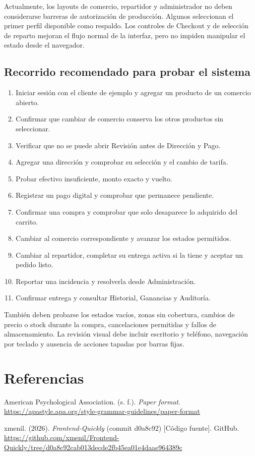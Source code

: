 \documentclass[12pt,letterpaper]{article}
\begin{document}
Actualmente, los layouts de comercio, repartidor y administrador no deben considerarse barreras de autorización de producción. Algunos seleccionan el primer perfil disponible como respaldo. Los controles de Checkout y de selección de reparto mejoran el flujo normal de la interfaz, pero no impiden manipular el estado desde el navegador.

\subsection{Recorrido recomendado para probar el sistema}

\begin{enumerate}
  \item Iniciar sesión con el cliente de ejemplo y agregar un producto de un comercio abierto.
  \item Confirmar que cambiar de comercio conserva los otros productos sin seleccionar.
  \item Verificar que no se puede abrir Revisión antes de Dirección y Pago.
  \item Agregar una dirección y comprobar su selección y el cambio de tarifa.
  \item Probar efectivo insuficiente, monto exacto y vuelto.
  \item Registrar un pago digital y comprobar que permanece pendiente.
  \item Confirmar una compra y comprobar que solo desaparece lo adquirido del carrito.
  \item Cambiar al comercio correspondiente y avanzar los estados permitidos.
  \item Cambiar al repartidor, completar su entrega activa si la tiene y aceptar un pedido listo.
  \item Reportar una incidencia y resolverla desde Administración.
  \item Confirmar entrega y consultar Historial, Ganancias y Auditoría.
\end{enumerate}

También deben probarse los estados vacíos, zonas sin cobertura, cambios de precio o stock durante la compra, cancelaciones permitidas y fallos de almacenamiento. La revisión visual debe incluir escritorio y teléfono, navegación por teclado y ausencia de acciones tapadas por barras fijas.

\clearpage
\section*{Referencias}
\begingroup
\setlength{\parindent}{0pt}
\setlength{\parskip}{0pt}
American Psychological Association. (s. f.). \textit{Paper format}. \url{https://apastyle.apa.org/style-grammar-guidelines/paper-format}\par
xmenil. (2026). \textit{Frontend-Quickly} (commit d0a8c92) [Código fuente]. GitHub. \url{https://github.com/xmenil/Frontend-Quickly/tree/d0a8c92cab013decde2fb45ea01e4daae964389c}\par
\endgroup
\end{document}
